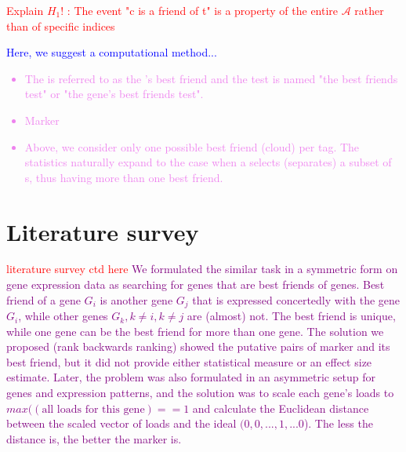\documentclass{llncs}
\begin{document}



\textcolor{red}{Explain $H_1$! : The event "c is a friend of t" is a property of the entire $\mathcal{A}$ rather than of specific indices}

\textcolor{blue}{Here, we suggest a computational method...}

\textcolor{violet}{\begin{itemize}
    \item The {\cloud} is referred to as the {\tag}'s best friend and the test is named "the best friends test" or "the gene's best friends test".
    \item Marker
    \item Above, we consider only one possible best friend (cloud) per tag. The statistics naturally expand to the case when a {\tag} selects (separates) a subset of {\cloud}s, thus having more than one best friend.
\end{itemize}}


\section{Literature survey}
\textcolor{red}{literature survey ctd here}
\textcolor{purple}{We formulated \cite{best_friends:2015} the similar task in a symmetric form on gene expression data as searching for genes that are best friends of genes. Best friend of a gene $G_i$ is another gene $G_j$ that is expressed concertedly with the gene $G_i$, while other genes $G_k, k\neq i, k \neq j$ are (almost) not. The best friend is unique, while one gene can be the best friend for more than one gene. The solution we proposed (rank backwards ranking) showed the putative pairs of marker and its best friend, but it did not provide either statistical measure or an effect size estimate. Later, the problem was also formulated in an asymmetric setup \cite{patternmarkers:2017} for genes and expression patterns, and the solution was to scale each gene's loads to $max((\mbox{all loads for this gene})==1$ and calculate the Euclidean distance between the scaled vector of loads and the ideal $(0,0,...,1,...0$). The less the distance is, the better the marker is. }
\end{document}
